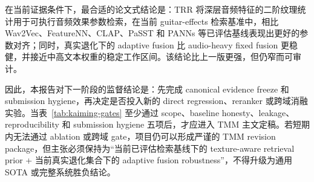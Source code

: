 在当前证据条件下，最合适的论文式结论是：TRR 将深层音频特征的二阶纹理统计用于可执行音频效果参数检索，在当前 guitar-effects 检索基准中，相比 Wav2Vec、FeatureNN、CLAP、PaSST 和 PANNs 等已评估基线表现出更好的参数对齐；同时，真实退化下的 adaptive fusion 比 audio-heavy fixed fusion 更稳健，并接近中高文本权重的稳定工作区间。该结论比上一版更强，但仍窄而可审计。



因此，本报告对下一阶段的监督结论是：先完成 canonical evidence freeze 和 submission hygiene，再决定是否投入新的 direct regression、reranker 或跨域消融实验。当表~\ref{tab:kaiming-gates} 至少通过 scope、baseline honesty、leakage、reproducibility 和 submission hygiene 五项后，才应进入 TMM 主文定稿。若短期内无法通过 ablation 或跨域 gate，项目仍可以形成严谨的 TMM revision package，但主张必须保持为“当前已评估检索基线下的 texture-aware retrieval prior + 当前真实退化集合下的 adaptive fusion robustness”，不得升级为通用 SOTA 或完整系统胜负结论。

